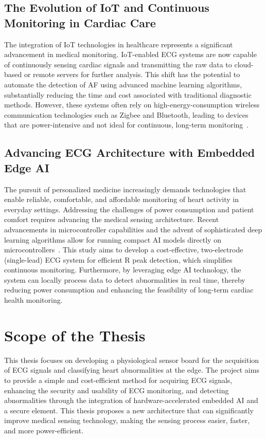 \subsection{The Evolution of IoT and Continuous Monitoring in Cardiac Care}

The integration of \ac{IoT} technologies in healthcare represents a significant advancement in medical monitoring. IoT-enabled ECG systems are now capable of continuously sensing cardiac signals and transmitting the raw data to cloud-based or remote servers for further analysis. This shift has the potential to automate the detection of AF using advanced machine learning algorithms, substantially reducing the time and cost associated with traditional diagnostic methods. However, these systems often rely on high-energy-consumption wireless communication technologies such as Zigbee and Bluetooth, leading to devices that are power-intensive and not ideal for continuous, long-term monitoring~\cite{muhoza2023}.

\subsection{Advancing ECG Architecture with Embedded Edge AI}

The pursuit of personalized medicine increasingly demands technologies that enable reliable, comfortable, and affordable monitoring of heart activity in everyday settings. Addressing the challenges of power consumption and patient comfort requires advancing the medical sensing architecture. Recent advancements in microcontroller capabilities and the advent of sophisticated deep learning algorithms allow for running compact AI models directly on microcontrollers~\cite{muhoza2023}. This study aims to develop a cost-effective, two-electrode (single-lead) ECG system for efficient R peak detection, which simplifies continuous monitoring. Furthermore, by leveraging edge AI technology, the system can locally process data to detect abnormalities in real time, thereby reducing power consumption and enhancing the feasibility of long-term cardiac health monitoring.

\section{Scope of the Thesis}

This thesis focuses on developing a physiological sensor board for the acquisition of ECG signals and classifying heart abnormalities at the edge. The project aims to provide a simple and cost-efficient method for acquiring ECG signals, enhancing the security and usability of ECG monitoring, and detecting abnormalities through the integration of hardware-accelerated embedded AI and a secure element. This thesis proposes a new architecture that can significantly improve medical sensing technology, making the sensing process easier, faster, and more power-efficient.

